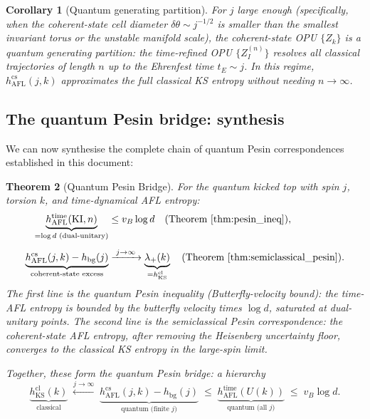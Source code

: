\documentclass[12pt,a4paper]{article}
\newtheorem{theorem}{Theorem}[section]
\newtheorem{corollary}[theorem]{Corollary}
\begin{document}
\begin{corollary}[Quantum generating partition]
  \label{cor:quantum_gen_partition}
  For $j$ large enough (specifically, when the coherent-state cell diameter
  $\delta\theta \sim j^{-1/2}$ is smaller than the smallest invariant torus
  or the unstable manifold scale), the coherent-state OPU $\{Z_k\}$ is a
  \emph{quantum generating partition}: the time-refined OPU
  $\{Z^{(n)}_I\}$ resolves all classical trajectories of length $n$
  up to the Ehrenfest time $t_E \sim j$.  In this regime, $h_{\mathrm{AFL}}^{\mathrm{cs}}(j,k)$
  approximates the full classical KS entropy without needing $n\to\infty$.
\end{corollary}

\subsection{The quantum Pesin bridge: synthesis}

We can now synthesise the complete chain of quantum Pesin correspondences
established in this document:

\begin{theorem}[Quantum Pesin Bridge]
  \label{thm:pesin_bridge}
  For the quantum kicked top with spin $j$, torsion $k$, and time-dynamical
  AFL entropy:
  \begin{align}
    \label{eq:pesin_bridge}
    \underbrace{h_{\mathrm{AFL}}^{\mathrm{time}}(\mathrm{KI},n)}_{=\log d \text{ (dual-unitary)}}
    &\leq v_B\log d
    \quad\text{(Theorem~\ref{thm:pesin_ineq})},
    \\[4pt]
    \underbrace{h_{\mathrm{AFL}}^{\mathrm{cs}}(j,k) - h_{\mathrm{bg}}(j)}_{
      \text{coherent-state excess}}
    &\xrightarrow{\;j\to\infty\;}
    \underbrace{\lambda_+(k)}_{ = h_{\mathrm{KS}}^{\mathrm{cl}}}
    \quad\text{(Theorem~\ref{thm:semiclassical_pesin})}.
  \end{align}
  The first line is the quantum Pesin inequality (Butterfly-velocity bound):
  the time-AFL entropy is bounded by the butterfly velocity times $\log d$,
  saturated at dual-unitary points.
  The second line is the semiclassical Pesin correspondence: the coherent-state
  AFL entropy, after removing the Heisenberg uncertainty floor, converges to the
  classical KS entropy in the large-spin limit.

  Together, these form the \emph{quantum Pesin bridge}: a hierarchy
  \[
    \underbrace{h_{\mathrm{KS}}^{\mathrm{cl}}(k)}_{\text{classical}}
    \;\xleftarrow{j\to\infty}\;
    \underbrace{h_{\mathrm{AFL}}^{\mathrm{cs}}(j,k) - h_{\mathrm{bg}}(j)}_{\text{quantum (finite } j)}
    \;\leq\;
    \underbrace{h_{\mathrm{AFL}}^{\mathrm{time}}(U(k))}_{\text{quantum (all } j)}
    \;\leq\; v_B\log d.
  \]
\end{theorem}
\end{document}
